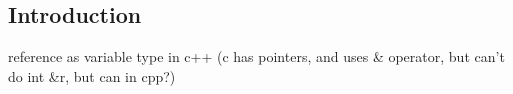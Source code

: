 
\subsection{Introduction}


reference as variable type in c++ (c has pointers, and uses \& operator, but can't do int \&r, but can in cpp?)
